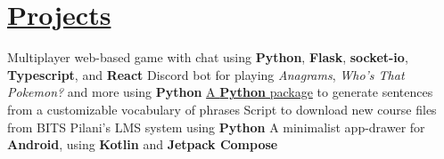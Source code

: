 
\section{\href{https://naveen-u.github.io/projects/}{Projects}}
\resumeItemListStart
{}
{Multiplayer web-based game with chat using \textbf{Python}, \textbf{Flask}, \textbf{socket-io}, \textbf{Typescript}, and \textbf{React}}
{Discord bot for playing \textit{Anagrams}, \textit{Who's That Pokemon?} and more using \textbf{Python}}
{\href{https://pypi.org/project/nabg/}{A \textbf{Python} package} to generate sentences from a customizable vocabulary of phrases}
{Script to download new course files from BITS Pilani's LMS system using \textbf{Python}}
{A minimalist app-drawer for \textbf{Android}, using \textbf{Kotlin} and \textbf{Jetpack Compose}}
\resumeItemListEnd